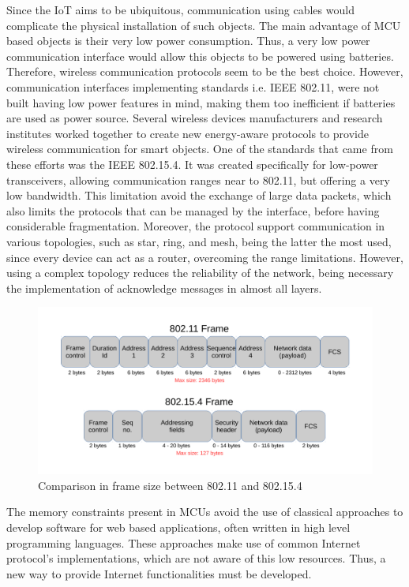 Since the IoT aims to be ubiquitous, communication using cables would complicate the physical installation of such objects.
The main advantage of MCU based objects is their very low power consumption.
Thus, a very low power communication interface would allow this objects to be powered using batteries.
Therefore, wireless communication protocols seem to be the best choice.
However, communication interfaces implementing standards i.e. IEEE 802.11, were not built having low power features in mind, making them too inefficient if batteries are used as power source.
Several wireless devices manufacturers and research institutes worked together to create new energy-aware protocols to provide wireless communication for smart objects.
One of the standards that came from these efforts was the IEEE 802.15.4\cite{ieee802.15.4}.
It was created specifically for low-power transceivers, allowing communication ranges near to 802.11, but offering a very low bandwidth.
This limitation avoid the exchange of large data packets, which also limits the protocols that can be managed by the interface, before having considerable fragmentation.
Moreover, the protocol support communication in various topologies, such as star, ring, and mesh, being the latter the most used, since every device can act as a router, overcoming the range limitations.
However, using a complex topology reduces the reliability of the network, being necessary the implementation of acknowledge messages in almost all layers.

\begin{figure}[htb]
	\centering
	\includegraphics[width=1\columnwidth]{chapters/background.images/FramesComparison.pdf}
	\caption{Comparison in frame size between 802.11 and 802.15.4}
	\label{fig:FramesComparison}
\end{figure}

The memory constraints present in MCUs avoid the use of classical approaches to develop software for web based applications, often written in high level programming languages.
These approaches make use of common Internet protocol's implementations, which are not aware of this low resources.
Thus, a new way to provide Internet functionalities must be developed.

